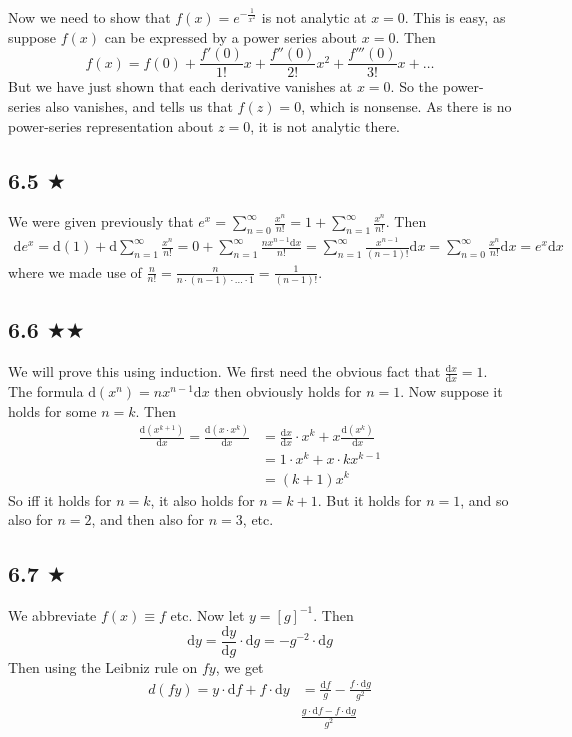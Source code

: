 \\ \\ Now we need to show that $f(x)=e^{-\frac{1}{x^2}}$ is not analytic at $x=0$. This is easy, as suppose $f(x)$ can be expressed by a power series about $x=0$. Then 
$$f(x)=f(0)+\frac{f'(0)}{1!}x+\frac{f''(0)}{2!}x^2+\frac{f'''(0)}{3!}x+\ldots$$
But we have just shown that each derivative vanishes at $x=0$. So the power-series also vanishes, and tells us that $f(z)=0$, which is nonsense. As there is no power-series representation about $z=0$, it is not analytic there.


\subsection{6.5 $\bigstar$}
We were given previously that $e^x=\sum^{\infty}_{n=0}\frac{x^n}{n!}=1+\sum^{\infty}_{n=1}\frac{x^n}{n!}$. Then
\begin{align*}
\text{d}e^x=\text{d}(1)+\text{d}\sum^{\infty}_{n=1}\frac{x^n}{n!}=0+\sum^{\infty}_{n=1}\frac{nx^{n-1}\text{d}x}{n!}=\sum^{\infty}_{n=1}\frac{x^{n-1}}{(n-1)!}\text{d}x=\sum^{\infty}_{n=0}\frac{x^n}{n!}\text{d}x=e^x\text{d}x
\end{align*}
where we made use of $\frac{n}{n!}=\frac{n}{n\cdot(n-1)\cdot\ldots\cdot 1}=\frac{1}{(n-1)!}$.


\subsection{6.6 $\bigstar \bigstar$}
We will prove this using induction. We first need the obvious fact that $\frac{\text{d}x}{\text{d}x}=1$. The formula $\text{d}(x^n)=nx^{n-1}\text{d}x$ then obviously holds for $n=1$. Now suppose it holds for some $n=k$. Then
\begin{align*}
\frac{\text{d}(x^{k+1})}{\text{d} x}=\frac{\text{d}(x\cdot x^{k})}{\text{d} x}&=\frac{\text{d}x}{\text{d} x}\cdot x^k+x\frac{\text{d}(x^{k})}{\text{d} x}\\
&=1\cdot x^k+x\cdot kx^{k-1}\\
&=(k+1)x^k
\end{align*} 
So iff it holds for $n=k$, it also holds for $n=k+1$. But it holds for $n=1$, and so also for $n=2$, and then also for $n=3$, etc.


\subsection{6.7 $\bigstar$}
We abbreviate $f(x)\equiv f$ etc. Now let $y=[g]^{-1}$. Then 
$$\text{d} y=\frac{\text{d} y}{\text{d} g}\cdot \text{d} g=-g^{-2}\cdot \text{d} g $$
Then using the Leibniz rule on $fy$, we get
\begin{align*}
d(fy)=y\cdot\text{d}f+f\cdot \text{d}y&=\frac{\text{d}f}{g}-\frac{f\cdot \text{d} g}{ g^{2}}\\
&\frac{g\cdot\text{d}f-f\cdot \text{d} g}{ g^{2}}
\end{align*}


